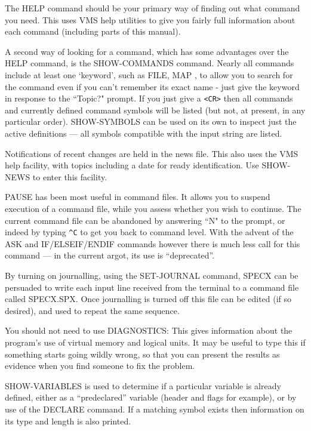 \documentclass[11pt,twoside]{report}
\begin{document}
The HELP command should be your primary way of finding out what command you
need. This uses VMS help utilities to give you fairly full information
about each command (including parts of this manual).

A second way of looking for a command, which has some advantages over the HELP
command, is the SHOW-COMMANDS command. Nearly all commands include at least
one `keyword', such as FILE, MAP \etc, to allow you to search
for the command even if you can't remember its exact name - just give the
keyword in response to the ``Topic?" prompt. If you just give a \verb+<CR>+
then all commands and currently defined command symbols will be listed (but
not, at present, in any particular order). SHOW-SYMBOLS can be used on its
own to inspect just the active definitions --- all symbols compatible with
the input string are listed.

Notifications of recent changes are held in the news file. This
also uses the VMS help facility, with topics including a date
for ready identification. Use SHOW-NEWS to enter this facility. 

PAUSE has been most useful in command files. It allows you to suspend execution
of a command file, while you assess whether you wish to continue. The current
command file can be abandoned by answering ``N" to the prompt, or indeed by
typing \verb+^C+ to get you back to command level. With the advent of the ASK
and IF/ELSEIF/ENDIF commands however there is much less call for this command
--- in the current argot, its use is ``deprecated''. 

By turning on journalling, using the SET-JOURNAL command,
SPECX can be persuaded to write each input line received from the terminal
to a command file called SPECX.SPX. Once journalling is turned off this file
can be edited (if so desired), and used to repeat the same sequence.

You should not need to use DIAGNOSTICS: This gives information about the
program's use of virtual memory and logical units. It may be useful to type
this if something starts going wildly wrong, so that you can present the
results as evidence when you find someone to fix the problem.

SHOW-VARIABLES is used to determine if a particular variable is already
defined, either as a ``predeclared'' variable (header and flags for example),
or by use of the DECLARE command. If a matching symbol exists then information
on its type and length is also printed.
\end{document}
